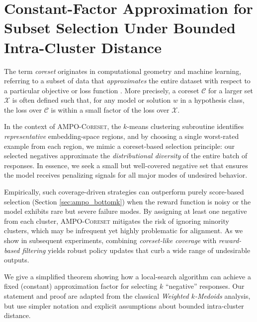 

\section{Constant-Factor Approximation for Subset Selection Under Bounded Intra-Cluster Distance}
\label{sec:constant_factor_subset_selection}

\noindent
The term \emph{coreset} originates in computational geometry and machine learning, referring to a subset of data that \emph{approximates} the entire dataset with respect to a particular objective or loss function \citep{bachem2017practical,feldman2020turning}. More precisely, a coreset $\mathcal{C}$ for a larger set $\mathcal{X}$ is often defined such that, for any model or solution $w$ in a hypothesis class, the loss over $\mathcal{C}$ is within a small factor of the loss over $\mathcal{X}$. 

In the context of \textsc{AMPO-Coreset}, the $k$-means clustering subroutine identifies \emph{representative} embedding-space regions, and by choosing a single worst-rated example from each region, we mimic a coreset-based selection principle: our selected negatives approximate the \emph{distributional diversity} of the entire batch of responses. In essence, we seek a small but well-covered negative set that ensures the model receives penalizing signals for all major modes of undesired behavior. 

Empirically, such coverage-driven strategies can outperform purely score-based selection (Section \ref{sec:ampo_bottomk}) when the reward function is noisy or the model exhibits rare but severe failure modes. By assigning at least one negative from each cluster, \textsc{AMPO-Coreset} mitigates the risk of ignoring minority clusters, which may be infrequent yet highly problematic for alignment. As we show in subsequent experiments, combining \emph{coreset-like coverage} with \emph{reward-based filtering} yields robust policy updates that curb a wide range of undesirable outputs.



We give a simplified theorem showing how a local-search algorithm can achieve a fixed (constant) approximation factor for selecting \(k\) ``negative'' responses. Our statement and proof are adapted from the classical \emph{Weighted \(k\)-Medoids} analysis, but use simpler notation and explicit assumptions about bounded intra-cluster distance.

